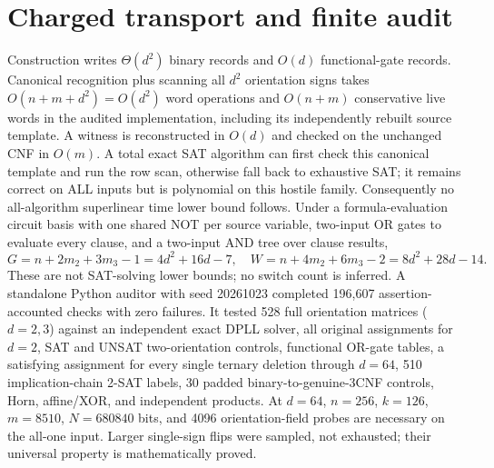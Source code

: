\documentclass[11pt]{article}
\begin{document}
\section{Charged transport and finite audit}
Construction writes $\Theta(d^2)$ binary records and $O(d)$ functional-gate records. Canonical recognition plus scanning all $d^2$ orientation signs takes $O(n+m+d^2)=O(d^2)$ word operations and $O(n+m)$ conservative live words in the audited implementation, including its independently rebuilt source template. A witness is reconstructed in $O(d)$ and checked on the unchanged CNF in $O(m)$. A total exact SAT algorithm can first check this canonical template and run the row scan, otherwise fall back to exhaustive SAT; it remains correct on ALL inputs but is polynomial on this hostile family. Consequently no all-algorithm superlinear time lower bound follows.
Under a formula-evaluation circuit basis with one shared NOT per source variable, two-input OR gates to evaluate every clause, and a two-input AND tree over clause results,
\[
G=n+2m_2+3m_3-1=4d^2+16d-7,\quad
W=n+4m_2+6m_3-2=8d^2+28d-14.
\]
These are not SAT-solving lower bounds; no switch count is inferred.
A standalone Python auditor with seed 20261023 completed 196,607 assertion-accounted checks with zero failures. It tested 528 full orientation matrices ($d=2,3$) against an independent exact DPLL solver, all original assignments for $d=2$, SAT and UNSAT two-orientation controls, functional OR-gate tables, a satisfying assignment for every single ternary deletion through $d=64$, 510 implication-chain 2-SAT labels, 30 padded binary-to-genuine-3CNF controls, Horn, affine/XOR, and independent products. At $d=64$, $n=256$, $k=126$, $m=8510$, $N=680840$ bits, and 4096 orientation-field probes are necessary on the all-one input. Larger single-sign flips were sampled, not exhausted; their universal property is mathematically proved.
\end{document}
